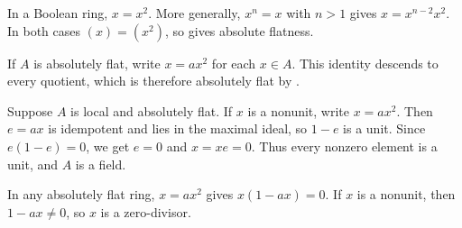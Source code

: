 In a Boolean ring, $x=x^2$. More generally, $x^n=x$ with $n>1$ gives $x=x^{n-2}x^2$. In both cases $(x)=(x^2)$, so  gives absolute flatness.

If $A$ is absolutely flat, write $x=ax^2$ for each $x\in A$. This identity descends to every quotient, which is therefore absolutely flat by .

Suppose $A$ is local and absolutely flat. If $x$ is a nonunit, write $x=ax^2$. Then $e=ax$ is idempotent and lies in the maximal ideal, so $1-e$ is a unit. Since $e(1-e)=0$, we get $e=0$ and $x=xe=0$. Thus every nonzero element is a unit, and $A$ is a field.

In any absolutely flat ring, $x=ax^2$ gives $x(1-ax)=0$. If $x$ is a nonunit, then $1-ax\neq0$, so $x$ is a zero-divisor.
